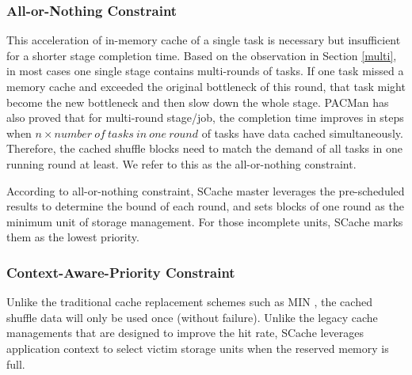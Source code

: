 \subsubsection{All-or-Nothing Constraint}
This acceleration of in-memory cache of a single task is necessary but insufficient for a shorter stage completion time. 
Based on the observation in Section \ref{multi}, in most cases one single stage contains multi-rounds of tasks. 
If one task missed a memory cache and exceeded the original bottleneck of this round, that task might become the new bottleneck and then slow down the whole stage. 
PACMan \cite{pacman} has also proved that for multi-round stage/job, the completion time improves in steps when $n\times number\ of\ tasks\ in\ one\ round$ of tasks have data cached simultaneously. 
Therefore, the cached shuffle blocks need to match the demand of all tasks in one running round at least. We refer to this as the all-or-nothing constraint.

According to all-or-nothing constraint, SCache master leverages the pre-scheduled results to determine the bound of each round, and sets blocks of one round as the minimum unit of storage management.
For those incomplete units, SCache marks them as the lowest priority.

\subsubsection{Context-Aware-Priority Constraint}
Unlike the traditional cache replacement schemes such as MIN \cite{min}, the cached shuffle data will only be used once (without failure). 
Unlike the legacy cache managements that are designed to improve the hit rate, 
SCache leverages application context to select victim storage units when the reserved memory is full.

